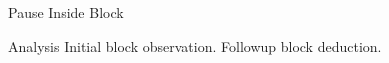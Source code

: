 \documentclass[14pt,t]{beamer-accessibility}
\begin{document}
\begin{frame}{Pause Inside Block}
\begin{block}{Analysis}
Initial block observation.
\pause
Followup block deduction.
\end{block}
\end{frame}
\end{document}

